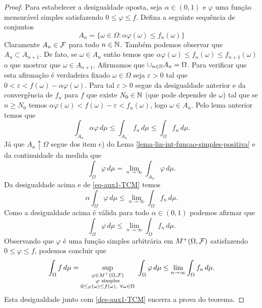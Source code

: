 \begin{proof}
Para estabelecer a desigualdade oposta, seja 
$\alpha\in (0,1)$ e $\varphi$ uma função mensurável
simples satisfazendo $0\leq \varphi\leq f$.
Defina a seguinte sequência de conjuntos 
\[
	A_n = \{\omega\in\Omega: 
			\alpha \varphi(\omega)\leq f_n(\omega)
		\}
\]
Claramente $A_n\in \mathcal{F}$ para todo $n\in\mathbb{N}$. Também 
podemos observar que $A_n\subset A_{n+1}$.
De fato, se $\omega\in A_n$ então 
temos que 
$\alpha \varphi(\omega)\leq f_n(\omega)\leq f_{n+1}(\omega)$
o que mostrar que $\omega\in A_{n+1}$.
Afirmamos que $\cup_{n\in\mathbb{N}} A_n = \Omega$.
Para verificar que esta afirmação é verdadeira 
fixado $\omega\in\Omega$ seja 
$\varepsilon>0$ tal que 
$0<\varepsilon<f(\omega)-\alpha\varphi(\omega)$. 
Para tal $\varepsilon>0$
segue da desigualdade anterior e da convergência de $f_n$
para $f$ que existe $N_0\in\mathbb{N}$
(que pode depender de $\omega$) tal que   
se $n\geq N_0$ temos 
$\alpha\varphi(\omega)< f(\omega)-\varepsilon < f_n(\omega)$, 
logo $\omega\in A_n$. Pelo lema anterior temos que 
	\begin{equation}\label{eq-aux1-TCM}
	\int_{A_n} \alpha\varphi\, d\mu
	\leq 
	\int_{A_n} f_n\, d\mu
	\leq
	\int_{\Omega} f_n\, d\mu.
	\end{equation}
Já que $A_n\uparrow \Omega$ segue dos item c) do 
Lema \ref{lema-lin-int-funcao-simples-positiva} e 
da continuidade da medida que 
	\[
		\int_{\Omega} \varphi\, d\mu
		=
		\lim_{n\to\infty} \int_{A_n} \varphi\, d\mu.
	\]
Da desigualdade acima e de \eqref{eq-aux1-TCM} temos 
	\[
		\alpha\int_{\Omega} \varphi\, d\mu
		\leq
		\lim_{n\to\infty} \int_{\Omega} f_n\, d\mu.
	\]
Como a desigualdade acima é válida para todo $\alpha\in(0,1)$
podemos afirmar que 
	\[
		\int_{\Omega} \varphi\, d\mu
		\leq
		\lim_{n\to\infty} \int_{\Omega} f_n\, d\mu.
	\]
Observando que $\varphi$ é uma função simples 
arbitrária em $M^{+}(\Omega,\mathcal{F})$ satisfazendo 
$0\leq \varphi\leq f$, podemos concluir que
\[
		\int_{\Omega} f\, d\mu
		=
		\sup_{ \substack{ 	\varphi \in M^{+}(\Omega,\F)
							\\
							\varphi\ \text{simples}
							\\ 
							0\leq\varphi(\omega)\leq f(\omega)
							,\ \forall \omega\in\Omega }  } 
		\ 
		\int_{\Omega} \varphi \, d\mu
		\leq
		\lim_{n\to\infty} \int_{\Omega} f_n\, d\mu.
\]
Esta desigualdade junto com \eqref{des-aux1-TCM}
encerra a prova do teorema.
\end{proof}